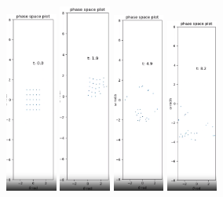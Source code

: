 \documentclass[11pt]{article} %
\begin{document}
    \begin{figure}[H]
        \centering
        \includegraphics[width=0.15\textwidth]{phase_0.png}
        \includegraphics[width=0.15\textwidth]{phase_1.png}
        \includegraphics[width=0.15\textwidth]{phase_2.png}
        \includegraphics[width=0.15\textwidth]{phase_3.png}

\end{figure}
\end{document}
